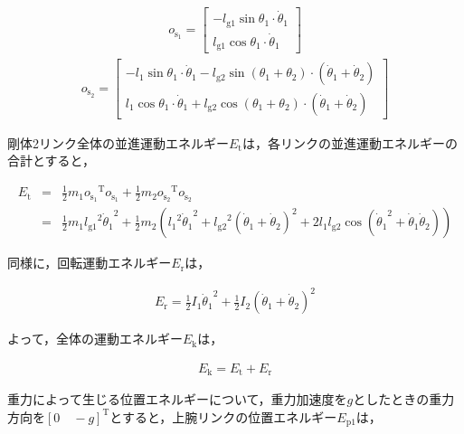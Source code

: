 \begin{eqnarray}
  o_{\mathrm{\dot{s}_{1}}} = 
              \begin{bmatrix}
              -l_{\mathrm{g1}}\sin\theta_{1} \cdot \dot{\theta}_{1}\\
              l_{\mathrm{g1}}\cos\theta_{1} \cdot \dot{\theta}_{1}
              \end{bmatrix}
\end{eqnarray}
\begin{eqnarray}
  o_{\mathrm{\dot{s}_{2}}} = 
              \begin{bmatrix}
                -l_{1}\sin\theta_{1} \cdot \dot{\theta}_{1} - l_{\mathrm{g2}}\sin(\theta_{1} + \theta_{2}) \cdot (\dot{\theta}_{1} + \dot{\theta}_{2})\\
                l_{1}\cos\theta_{1} \cdot \dot{\theta}_{1} + l_{\mathrm{g2}}\cos(\theta_{1} + \theta_{2}) \cdot (\dot{\theta}_{1} + \dot{\theta}_{2})
              \end{bmatrix}
\end{eqnarray}

剛体2リンク全体の並進運動エネルギー$E_{\mathrm{t}}$は，各リンクの並進運動エネルギーの合計とすると，

\begin{eqnarray}
  E_{\mathrm{t}}
  &=&\frac{1}{2}m_{1}o_{\mathrm{\dot{s}_{1}}}{}^\mathrm{T}\!o_{\mathrm{\dot{s}_{1}}} + \frac{1}{2}m_{2}o_{\mathrm{\dot{s}_{2}}}{}^\mathrm{T}\!o_{\mathrm{\dot{s}_{2}}} \nonumber \\
  &=&\frac{1}{2}m_{1}{l_{\mathrm{g1}}}^2{\dot{\theta}_{1}}^2 + \frac{1}{2}m_{2}({{l_{1}}^2}{\dot{\theta}_{1}}^2 + {l_{\mathrm{g2}}}^2(\dot{\theta}_{1} + \dot{\theta}_{2})^2 + 2{l_{1}}{l_{\mathrm{g2}}}\cos({\dot{\theta}_{1}}^2 + \dot{\theta}_{1}\dot{\theta}_{2}))
\end{eqnarray}

同様に，回転運動エネルギー$E_{\mathrm{r}}$は，

\begin{eqnarray}
  E_{\mathrm{r}}
  =\frac{1}{2}I_{1}{\dot{\theta}_{1}}^2 + \frac{1}{2}I_{2}(\dot{\theta}_{1} + \dot{\theta}_{2})^2
\end{eqnarray}

よって，全体の運動エネルギー$E_{\mathrm{k}}$は，

\begin{eqnarray}
  E_{\mathrm{k}}
  =E_{\mathrm{t}} + E_{\mathrm{r}}
\end{eqnarray}

重力によって生じる位置エネルギーについて，重力加速度を$g$としたときの重力方向を${[0 \quad -g]}^\mathrm{T}$とすると，上腕リンクの位置エネルギー$E_{\mathrm{p1}}$は，

